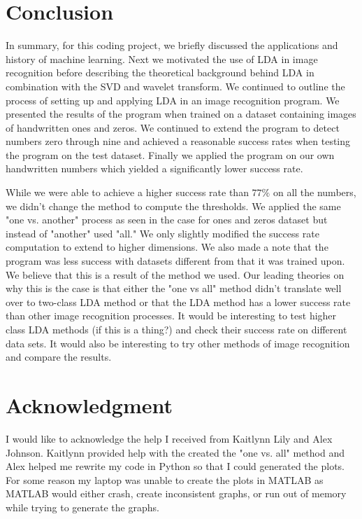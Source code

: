 \documentclass[12pt]{article}%
\numberwithin{equation}{subsection}
\begin{document}
\section{Conclusion}\label{Sec: Conclusion}
In summary, for this coding project, we briefly discussed the applications and history of machine learning. Next we motivated the use of LDA in image recognition before describing the theoretical background behind LDA in combination with the SVD and wavelet transform. We continued to outline the process of setting up and applying LDA in an image recognition program. We presented the results of the program when trained on a dataset containing images of handwritten ones and zeros. We continued to extend the program to detect numbers zero through nine and achieved a reasonable success rates when testing the program on the test dataset. Finally we applied the program on our own handwritten numbers which yielded a significantly lower success rate. 

While we were able to achieve a higher success rate than $77\%$ on all the numbers, we didn't change the method to compute the thresholds. We applied the same "one vs. another" process as seen in the case for ones and zeros dataset but instead of "another" used "all." We only slightly modified the success rate computation to extend to higher dimensions. We also made a note that the program was less success with datasets different from that it was trained upon. We believe that this is a result of the method we used. Our leading theories on why this is the case is that either the "one vs all" method didn't translate well over to two-class LDA method or that the LDA method has a lower success rate than other image recognition processes. It would be interesting to test higher class LDA methods (if this is a thing?) and check their success rate on different data sets. It would also be interesting to try other methods of image recognition and compare the results. 

\section*{Acknowledgment}

I would like to acknowledge the help I received from Kaitlynn Lily and Alex Johnson. Kaitlynn provided help with the created the "one vs. all" method and Alex helped me rewrite my code in Python so that I could generated the plots. For some reason my laptop was unable to create the plots in MATLAB as MATLAB would either crash, create inconsistent graphs, or run out of memory while trying to generate the graphs. 
\end{document}
